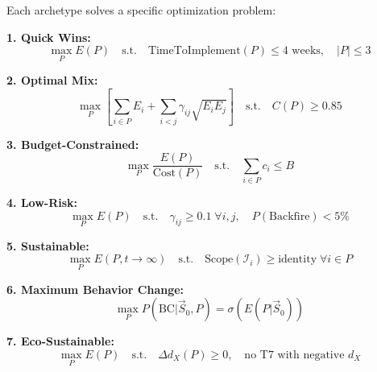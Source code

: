 \begin{tcolorbox}[colback=blue!5!white, colframe=blue!75!black,
    title=\textbf{Theorem HHH-T10: Archetype Optimization Problems}]

Each archetype solves a specific optimization problem:

\textbf{1. Quick Wins:}
\begin{equation}
\max_{P} E(P) \quad \text{s.t.} \quad \text{TimeToImplement}(P) \leq 4 \text{ weeks}, \quad |P| \leq 3
\end{equation}

\textbf{2. Optimal Mix:}
\begin{equation}
\max_{P} \left[ \sum_{i \in P} E_i + \sum_{i<j} \gamma_{ij} \sqrt{E_i E_j} \right] \quad \text{s.t.} \quad C(P) \geq 0.85
\end{equation}

\textbf{3. Budget-Constrained:}
\begin{equation}
\max_{P} \frac{E(P)}{\text{Cost}(P)} \quad \text{s.t.} \quad \sum_{i \in P} c_i \leq B
\end{equation}

\textbf{4. Low-Risk:}
\begin{equation}
\max_{P} E(P) \quad \text{s.t.} \quad \gamma_{ij} \geq 0.1 \; \forall i,j, \quad P(\text{Backfire}) < 5\%
\end{equation}

\textbf{5. Sustainable:}
\begin{equation}
\max_{P} E(P, t \to \infty) \quad \text{s.t.} \quad \text{Scope}(\mathcal{I}_i) \geq \text{identity} \; \forall i \in P
\end{equation}

\textbf{6. Maximum Behavior Change:}
\begin{equation}
\max_{P} P(\text{BC} | \vec{S}_0, P) = \sigma\left( E(P | \vec{S}_0) \right)
\end{equation}

\textbf{7. Eco-Sustainable:}
\begin{equation}
\max_{P} E(P) \quad \text{s.t.} \quad \Delta d_X(P) \geq 0, \quad \text{no T7 with negative } d_X
\end{equation}

\end{tcolorbox}

